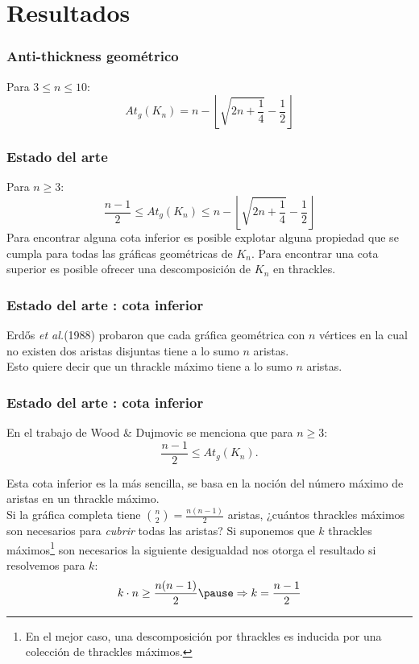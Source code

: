 \section{Resultados}
\begin{frame}
\frametitle{Anti-thickness geométrico}
Para $3 \leq n \leq 10$:
\[  At_g(K_n) = n - \left\lfloor\sqrt{2n + \frac{1}{4}} - \frac{1}{2} \right\rfloor \]
\end{frame}
\begin{frame}
\frametitle{Estado del arte}
Para $n \geq 3$:
\[  \frac{n-1}{2} \leq At_g(K_n) \leq n - \left\lfloor\sqrt{2n + \frac{1}{4}} - \frac{1}{2} \right\rfloor \]
Para encontrar alguna cota inferior es posible explotar alguna propiedad que se cumpla para todas las gráficas geométricas de $K_n$. Para encontrar una cota superior es posible ofrecer una descomposición de $K_n$ en thrackles.
\end{frame}
\begin{frame}
\frametitle{Estado del arte : cota inferior}
Erd\H{o}s \emph{et al.}(1988) probaron que cada gráfica geométrica con $n$ vértices en la cual no existen dos aristas disjuntas tiene a lo sumo $n$ aristas. 
\\[10pt]
Esto quiere decir que un thrackle máximo tiene a lo sumo $n$ aristas.
\end{frame}
\begin{frame}
\frametitle{Estado del arte : cota inferior}
En el trabajo de Wood \& Dujmovic se menciona que para $n \geq 3$:
\[  \frac{n-1}{2} \leq At_g(K_n).\] 
\pause

Esta cota inferior es la más sencilla, se basa en la noción del número máximo de aristas en un thrackle máximo. 
\\[5pt]
Si la gráfica completa tiene $\binom{n}{2} = \frac{n(n-1)}{2}$ aristas, ¿cuántos thrackles máximos son necesarios para \emph{cubrir} todas las aristas? Si suponemos que $k$ thrackles máximos\footnote{En el mejor caso, una descomposición por thrackles es inducida por una colección de thrackles máximos.} son necesarios la siguiente desigualdad nos otorga el resultado si resolvemos para $k$: \[ k\cdot n \geq \frac{n(n-1)}{2} \pause \Rightarrow k = \frac{n-1}{2}\]
\end{frame}

